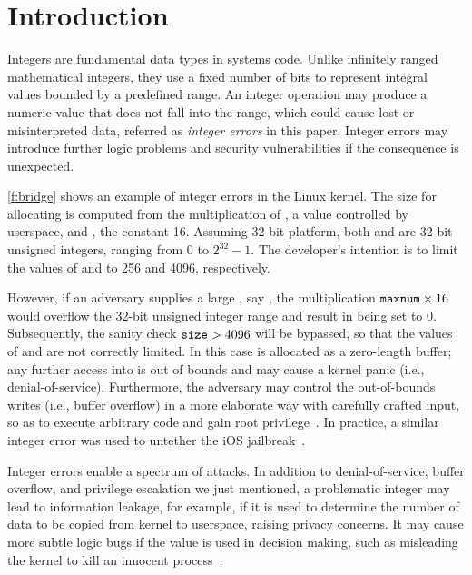 \section{Introduction}
\label{s:intro}

Integers are fundamental data types in systems code.  Unlike
infinitely ranged mathematical integers, they use a fixed number
of bits to represent integral values bounded by a predefined range.
An integer operation may produce a numeric value that does not fall
into the range, which could cause lost or misinterpreted data, referred
as \emph{integer errors} in this paper.  Integer errors may introduce
further logic problems and security vulnerabilities if the consequence
is unexpected.

\autoref{f:bridge} shows an example of integer errors in the Linux
kernel.  The size for allocating  is computed from the
multiplication of , a value controlled by userspace,
and , the constant 16.  Assuming
32-bit platform, both  and  are 32-bit unsigned
integers, ranging from 0 to $2^{32} - 1$.
The developer's intention is to limit the values of 
 and  to 256 and 4096, respectively.

However, if an adversary supplies a large , say
, the multiplication $\texttt{maxnum} \times 16$ would
overflow the 32-bit unsigned integer range and result in 
being set to 0.  Subsequently, the sanity check $\texttt{size} > 4096$
will be bypassed, so that the values of  and 
are not correctly limited.  In this case  is allocated as
a zero-length buffer; any further access into  is out of
bounds and may cause a kernel panic (i.e., denial-of-service).
Furthermore, the adversary may control the out-of-bounds writes
(i.e., buffer overflow) in a more elaborate way with carefully
crafted input, so as to execute arbitrary code and gain root
privilege~\cite[CVE-2006-5751]{cve}.  In practice, a similar integer
error was used to untether the iOS jailbreak~\cite{esser:ios}.

Integer errors enable a spectrum of attacks.  In addition to
denial-of-service, buffer overflow, and privilege escalation we
just mentioned, a problematic integer may lead to information
leakage, for example, if it is used to determine the number of data
to be copied from kernel to userspace, raising privacy concerns.
It may cause more subtle logic bugs if the value is used in decision
making, such as misleading the kernel to kill an innocent
process~\cite[CVE-2011-4097]{cve}.

